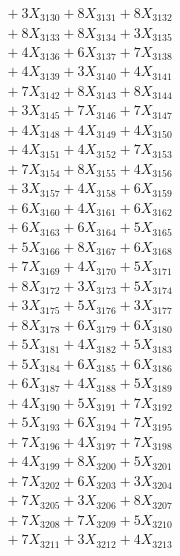 \documentclass[a4paper,10pt]{article}
\begin{document}
{\begin{align}
&\;  + 3 X_{3130} + 8 X_{3131} + 8 X_{3132} \\[0.3ex]
&\;  + 8 X_{3133} + 8 X_{3134} + 3 X_{3135} \\[0.3ex]
&\;  + 4 X_{3136} + 6 X_{3137} + 7 X_{3138} \\[0.3ex]
&\;  + 4 X_{3139} + 3 X_{3140} + 4 X_{3141} \\[0.3ex]
&\;  + 7 X_{3142} + 8 X_{3143} + 8 X_{3144} \\[0.3ex]
&\;  + 3 X_{3145} + 7 X_{3146} + 7 X_{3147} \\[0.3ex]
&\;  + 4 X_{3148} + 4 X_{3149} + 4 X_{3150} \\[0.3ex]
&\;  + 4 X_{3151} + 4 X_{3152} + 7 X_{3153} \\[0.3ex]
&\;  + 7 X_{3154} + 8 X_{3155} + 4 X_{3156} \\[0.3ex]
&\;  + 3 X_{3157} + 4 X_{3158} + 6 X_{3159} \\[0.5ex]\allowbreak
&\;  + 6 X_{3160} + 4 X_{3161} + 6 X_{3162} \\[0.3ex]
&\;  + 6 X_{3163} + 6 X_{3164} + 5 X_{3165} \\[0.3ex]
&\;  + 5 X_{3166} + 8 X_{3167} + 6 X_{3168} \\[0.3ex]
&\;  + 7 X_{3169} + 4 X_{3170} + 5 X_{3171} \\[0.3ex]
&\;  + 8 X_{3172} + 3 X_{3173} + 5 X_{3174} \\[0.3ex]
&\;  + 3 X_{3175} + 5 X_{3176} + 3 X_{3177} \\[0.3ex]
&\;  + 8 X_{3178} + 6 X_{3179} + 6 X_{3180} \\[0.3ex]
&\;  + 5 X_{3181} + 4 X_{3182} + 5 X_{3183} \\[0.3ex]
&\;  + 5 X_{3184} + 6 X_{3185} + 6 X_{3186} \\[0.3ex]
&\;  + 6 X_{3187} + 4 X_{3188} + 5 X_{3189} \\[0.5ex]\allowbreak
&\;  + 4 X_{3190} + 5 X_{3191} + 7 X_{3192} \\[0.3ex]
&\;  + 5 X_{3193} + 6 X_{3194} + 7 X_{3195} \\[0.3ex]
&\;  + 7 X_{3196} + 4 X_{3197} + 7 X_{3198} \\[0.3ex]
&\;  + 4 X_{3199} + 8 X_{3200} + 5 X_{3201} \\[0.3ex]
&\;  + 7 X_{3202} + 6 X_{3203} + 3 X_{3204} \\[0.3ex]
&\;  + 7 X_{3205} + 3 X_{3206} + 8 X_{3207} \\[0.3ex]
&\;  + 7 X_{3208} + 7 X_{3209} + 5 X_{3210} \\[0.3ex]
&\;  + 7 X_{3211} + 3 X_{3212} + 4 X_{3213} \\[0.3ex]

\end{align}}
\end{document}
